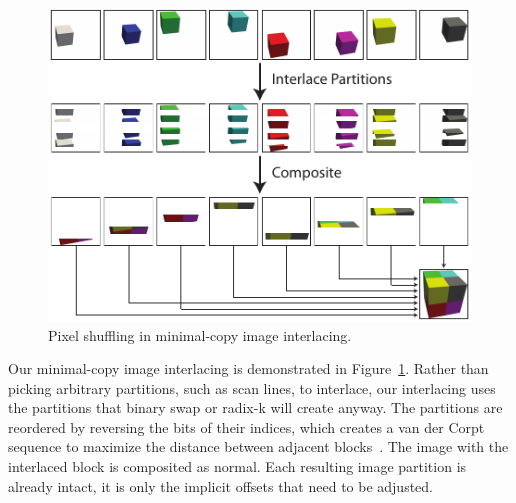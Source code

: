 \documentclass{acm_proc_article-sp}
\newcommand*{\lcite}[1]{~\cite{#1}}
\begin{document}
\begin{figure}[htbp]
  \centering
  \includegraphics{images/InterlaceDiagram}
  \caption{Pixel shuffling in minimal-copy image interlacing.}
  \label{fig:Interlacing}
\end{figure}

Our minimal-copy image interlacing is demonstrated in
Figure~\ref{fig:Interlacing}.  Rather than picking arbitrary partitions,
such as scan lines, to interlace, our interlacing uses the partitions that
binary swap or radix-k will create anyway.  The partitions are reordered by
reversing the bits of their indices, which creates a van der Corpt sequence
to maximize the distance between adjacent blocks\lcite{LaValle2006}.  The
image with the interlaced block is composited as normal.  Each resulting
image partition is already intact, it is only the implicit offsets that
need to be adjusted.
\end{document}
